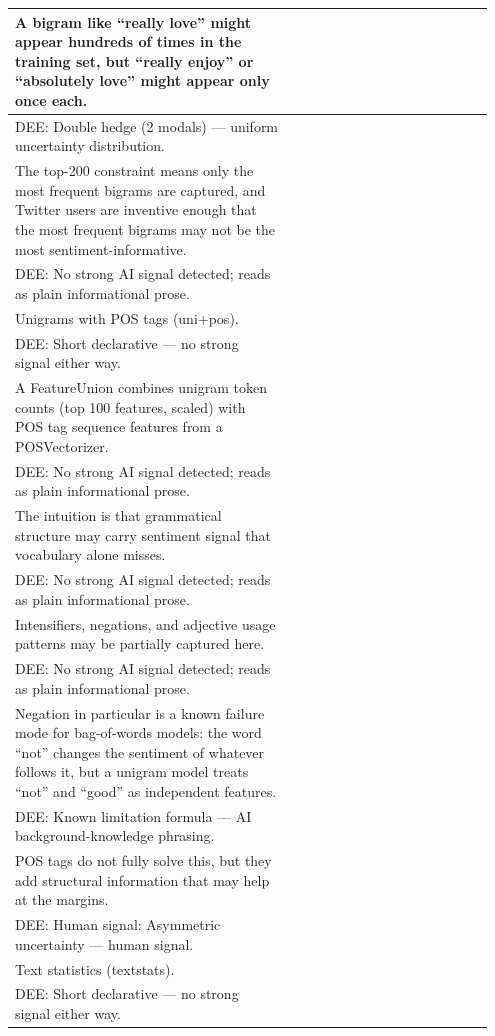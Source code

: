\documentclass[11pt]{article}
\begin{document}
\begin{longtable}{|p{0.55\linewidth}|p{0.40\linewidth}|}
\hline
A bigram like ``really love'' might appear hundreds of times in the training set, but ``really enjoy'' or ``absolutely love'' might appear only once each. & \\[2pt]
\hline
DEE: Double hedge (2 modals) --- uniform uncertainty distribution. & \\
\hline
The top-200 constraint means only the most frequent bigrams are captured, and Twitter users are inventive enough that the most frequent bigrams may not be the most sentiment-informative. & \\[2pt]
\hline
DEE: No strong AI signal detected; reads as plain informational prose. & \\
\hline
Unigrams with POS tags (uni+pos). & \\[2pt]
\hline
DEE: Short declarative --- no strong signal either way. & \\
\hline
A FeatureUnion combines unigram token counts (top 100 features, scaled) with POS tag sequence features from a POSVectorizer. & \\[2pt]
\hline
DEE: No strong AI signal detected; reads as plain informational prose. & \\
\hline
The intuition is that grammatical structure may carry sentiment signal that vocabulary alone misses. & \\[2pt]
\hline
DEE: No strong AI signal detected; reads as plain informational prose. & \\
\hline
Intensifiers, negations, and adjective usage patterns may be partially captured here. & \\[2pt]
\hline
DEE: No strong AI signal detected; reads as plain informational prose. & \\
\hline
Negation in particular is a known failure mode for bag-of-words models: the word ``not'' changes the sentiment of whatever follows it, but a unigram model treats ``not'' and ``good'' as independent features. & \\[2pt]
\hline
DEE: Known limitation formula --- AI background-knowledge phrasing. & \\
\hline
POS tags do not fully solve this, but they add structural information that may help at the margins. & \\[2pt]
\hline
DEE: Human signal: Asymmetric uncertainty --- human signal. & \\
\hline
Text statistics (textstats). & \\[2pt]
\hline
DEE: Short declarative --- no strong signal either way. & \\
\hline

\end{longtable}
\end{document}
